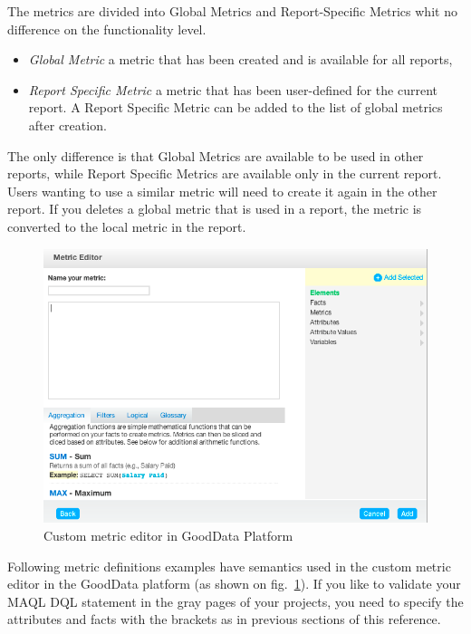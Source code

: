 \documentclass[a4paper, 12pt, titlepage, fleqn]{article}
\begin{document}
The metrics are divided into Global Metrics and Report-Specific Metrics whit no difference on the functionality level.

\begin{itemize}
\item \emph{Global Metric} a metric that has been created and is available for all reports,
\item \emph{Report Specific Metric} a metric that has been user-defined for the current report. A Report Specific Metric can be added to the list of global metrics after creation.
\end{itemize}

The only difference is that Global Metrics are available to be used in other reports, while Report Specific Metrics are available only in the current report. Users wanting to use a similar metric will need to create it again in the other report. If you deletes a global metric that is used in a report, the metric is converted to the local metric in the report.

\begin{figure}[htb]
\centering
\includegraphics[scale=0.4]{images/metriceditor.png}
\caption{Custom metric editor in GoodData Platform}
\label{fig:medi}
\end{figure}

Following metric definitions examples have semantics used in the custom metric editor in the GoodData platform (as shown on fig.~\ref{fig:medi}). If you like to validate your MAQL DQL statement in the gray pages of your projects, you need to specify the attributes and facts with the brackets as in previous sections of this reference. 
\end{document}
